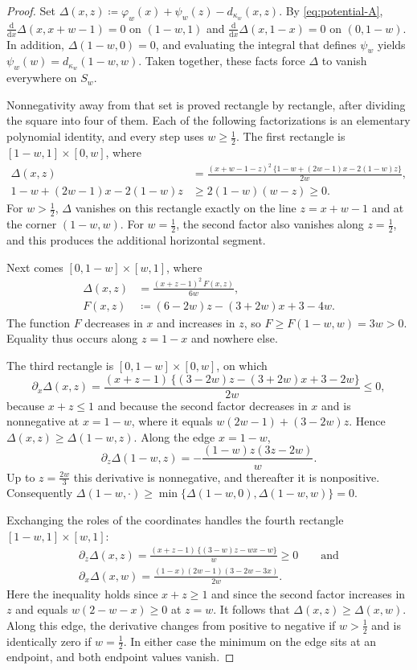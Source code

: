 \documentclass[11pt,a4paper]{article}
\theoremstyle{remark}
\newcommand{\1}{\mathbf{1}}
\begin{document}
\begin{proof}
Set $\Delta(x,z)\coloneqq\varphi_w(x)+\psi_w(z)-d_{\kappa_w}(x,z)$.
By \eqref{eq:potential-A}, $\frac{\mathrm d}{\mathrm dx}\Delta(x,x+w-1)=0$ on $(1-w,1)$ and $\frac{\mathrm d}{\mathrm dx}\Delta(x,1-x)=0$ on $(0,1-w)$.
In addition, $\Delta(1-w,0)=0$, and evaluating the integral that defines $\psi_w$ yields $\psi_w(w)=d_{\kappa_w}(1-w,w)$.
Taken together, these facts force $\Delta$ to vanish everywhere on $S_w$.

Nonnegativity away from that set is proved rectangle by rectangle, after dividing the square into four of them.
Each of the following factorizations is an elementary polynomial identity, and every step uses $w\ge\frac12$.
The first rectangle is $[1-w,1]\times[0,w]$, where
\[
  \begin{aligned}
  \Delta(x,z)&=\frac{(x+w-1-z)^2\,\bigl\{1-w+(2w-1)x-2(1-w)z\bigr\}}{2w},\\
  1-w+(2w-1)x-2(1-w)z&\ge2(1-w)(w-z)\ge0.
  \end{aligned}
\]
For $w>\frac12$, $\Delta$ vanishes on this rectangle exactly on the line $z=x+w-1$ and at the corner $(1-w,w)$.
For $w=\frac12$, the second factor also vanishes along $z=\frac12$, and this produces the additional horizontal segment.

Next comes $[0,1-w]\times[w,1]$, where
\[
  \begin{aligned}
  \Delta(x,z)&=\frac{(x+z-1)^2\,F(x,z)}{6w},\\
  F(x,z)&\coloneqq(6-2w)z-(3+2w)x+3-4w.
  \end{aligned}
\]
The function $F$ decreases in $x$ and increases in $z$, so $F\ge F(1-w,w)=3w>0$.
Equality thus occurs along $z=1-x$ and nowhere else.

The third rectangle is $[0,1-w]\times[0,w]$, on which
\[
  \partial_x\Delta(x,z)=\frac{(x+z-1)\,\bigl\{(3-2w)z-(3+2w)x+3-2w\bigr\}}{2w}\le0,
\]
because $x+z\le1$ and because the second factor decreases in $x$ and is nonnegative at $x=1-w$, where it equals $w(2w-1)+(3-2w)z$.
Hence $\Delta(x,z)\ge\Delta(1-w,z)$.
Along the edge $x=1-w$,
\[
  \partial_z\Delta(1-w,z)=-\frac{(1-w)z(3z-2w)}{w}.
\]
Up to $z=\frac{2w}{3}$ this derivative is nonnegative, and thereafter it is nonpositive.
Consequently $\Delta(1-w,\cdot)\ge\min\{\Delta(1-w,0),\Delta(1-w,w)\}=0$.

Exchanging the roles of the coordinates handles the fourth rectangle $[1-w,1]\times[w,1]$:
\begin{gather*}
  \partial_z\Delta(x,z)=\frac{(x+z-1)\,\bigl\{(3-w)z-wx-w\bigr\}}{w}\ge0
  \qquad\text{and}\\
  \partial_x\Delta(x,w)=\frac{(1-x)(2w-1)(3-2w-3x)}{2w}.
\end{gather*}
Here the inequality holds since $x+z\ge1$ and since the second factor increases in $z$ and equals $w(2-w-x)\ge0$ at $z=w$.
It follows that $\Delta(x,z)\ge\Delta(x,w)$.
Along this edge, the derivative changes from positive to negative if $w>\frac12$ and is identically zero if $w=\frac12$.
In either case the minimum on the edge sits at an endpoint, and both endpoint values vanish.


\end{proof}
\end{document}
